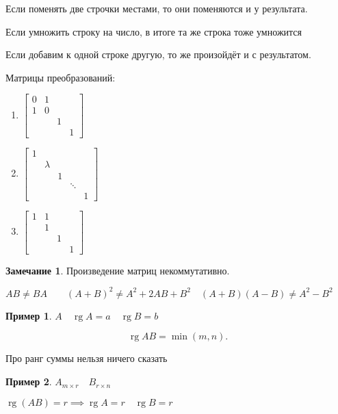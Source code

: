 \documentclass{book}
\DeclareMathOperator{\rg}{rg}
\theoremstyle{definition}
\newtheorem*{note}{Замечание}
\newtheorem*{example}{Пример}
\begin{document}
Если поменять две строчки местами, то они поменяются и у результата.

Если умножить строку на число, в итоге та же строка тоже умножится

Если добавим к одной строке другую, то же произойдёт и с результатом.

Матрицы преобразований:
\begin{enumerate}
    \item $\begin{bmatrix} 0 & 1 &  & \\ 1 & 0 & &\\ & & 1 &\\ &&&1 \end{bmatrix} $\\
    \item $\begin{bmatrix} 1 & & & \\ &\lambda & && \\ &&1&&\\ &&&\ddots &\\ &&&&1 \end{bmatrix} $
    \item $\begin{bmatrix} 1 & 1&&\\&1&&\\&&1&\\&&&1 \end{bmatrix} $
\end{enumerate}

\begin{note}
    Произведение матриц некоммутативно. 

    $AB\neq BA\qquad (A+B)^2 \neq A^2+2AB+B^2\quad (A+B)(A-B)\neq A^2-B^2$
\end{note}

\begin{example}
    $A\quad \rg A = a\quad \rg B = b$

     \[
         \rg AB = \min(m, n)
    .\] 

    Про ранг суммы нельзя ничего сказать
\end{example}

\begin{example}
    $A_{m\times r}\quad B_{r\times n}$

    $\rg (AB) = r \implies \rg A = r\quad \rg B = r$
\end{example}
\end{document}
